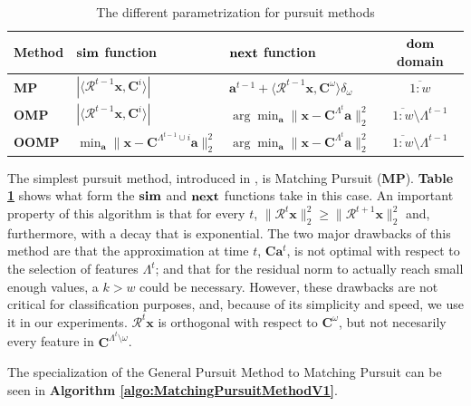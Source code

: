 \documentclass[12pt,a4paper,oneside,english]{UPBThesis}
\newcommand{\hcrange}[2]{\overline{{#1}\colon\!\!{#2}}}
\begin{document}
\renewcommand{\arraystretch}{1.5}
\begin{table}
  \caption{The different parametrization for pursuit methods}
  \label{table:PursuitParametrization}
  \begin{tabularx}{\textwidth}{|l|>{\centering}X|>{\centering}X|c|}
       \hline
        Method & $\text{\textbf{sim}}$ function & $\text{\textbf{next}}$ function & $\text{\textbf{dom}}$ domain\\ \hline \hline
        \textbf{MP} & $\left| \langle \mathcal{R}^{t-1}\textbf{x} , \textbf{C}^i \rangle \right|$ & $\textbf{a}^{t-1} + \langle \mathcal{R}^{t-1}\textbf{x} , \textbf{C}^\omega \rangle \delta_\omega$ & $\hcrange{1}{w}$ \\  \hline
        \textbf{OMP} & $\left| \langle \mathcal{R}^{t-1}\textbf{x} , \textbf{C}^i \rangle \right|$ & $\arg\min_{\textbf{a}} {\| \textbf{x} - \textbf{C}^{\Lambda^t}\textbf{a} \|_2^2}$ & $\hcrange{1}{w} \setminus \Lambda^{t-1}$ \\ \hline
        \textbf{OOMP} & $\min_{\textbf{a}} {\| \textbf{x} - \textbf{C}^{\Lambda^{t-1} \cup i}\textbf{a} \|_2^2}$ & $\arg\min_{\textbf{a}} {\| \textbf{x} - \textbf{C}^{\Lambda^t}\textbf{a} \|_2^2}$ & $\hcrange{1}{w} \setminus \Lambda^{t-1}$ \\
       \hline
    \end{tabularx}
\end{table}
\renewcommand{\arraystretch}{1.0}

The simplest pursuit method, introduced in \cite{matchingpursuit1}, is Matching Pursuit (\textbf{MP}). \textbf{Table \ref{table:PursuitParametrization}} shows what form the $\text{\textbf{sim}}$ and $\text{\textbf{next}}$ functions take in this case. An important property of this algorithm is that for every $t$, $\|\mathcal{R}^t\textbf{x}\|_2^2 \geq \|\mathcal{R}^{t+1}\textbf{x}\|_2^2$ and, furthermore, with a decay that is exponential. The two major drawbacks of this method are that the approximation at time $t$, $\textbf{C}\textbf{a}^t$, is not optimal with respect to the selection of features $\Lambda^t$; and that for the residual norm to actually reach small enough values, a $k > w$ could be necessary. However, these drawbacks are not critical for classification purposes, and, because of its simplicity and speed, we use it in our experiments. $\mathcal{R}^t\textbf{x}$ is orthogonal with respect to $\textbf{C}^\omega$, but not necesarily every feature in $\textbf{C}^{\Lambda^t \setminus \omega}$.

The specialization of the General Pursuit Method to Matching Pursuit can be seen in \textbf{Algorithm \ref{algo:MatchingPursuitMethodV1}}.
\end{document}
